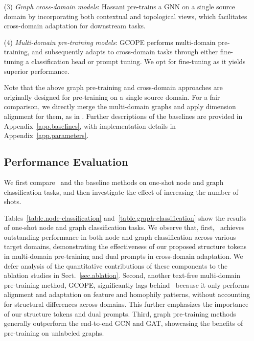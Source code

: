 (3) \textit{Graph cross-domain models}: Hassani \cite{hassani2022cross} pre-trains a GNN on a single source domain by incorporating both contextual and topological views, which facilitates cross-domain adaptation for downstream tasks.

(4) \emph{Multi-domain pre-training models}: GCOPE \cite{zhao2024all} performs multi-domain pre-training, and subsequently adapts to cross-domain tasks through either fine-tuning a classification head or prompt tuning. We opt for fine-tuning as it yields superior performance. 

Note that the above graph pre-training and cross-domain approaches are originally designed for pre-training on a single source domain. For a fair comparison, we directly merge the multi-domain graphs and apply dimension alignment for them, as in \model.
Further descriptions of the baselines are provided in Appendix~\ref{app.baselines}, with implementation details in Appendix~\ref{app.parameters}.



\subsection{Performance Evaluation}\label{sec.exp.per}
We first compare \model\ and the baseline methods on one-shot node and graph classification tasks, and then investigate the effect of increasing the number of shots.


\label{exp.main}
Tables~\ref{table.node-classification} and~\ref{table.graph-classification} show the results of one-shot node and graph classification tasks. 
We observe that, first, \model\ achieves outstanding performance in both node and graph classification across various target domains, demonstrating the effectiveness of our proposed structure tokens in multi-domain pre-training and dual prompts in cross-domain adaptation. We defer analysis of the quantitative contributions of these components to the ablation studies in Sect.~\ref{sec.ablation}.
Second, another text-free multi-domain pre-training method, GCOPE, significantly lags behind \model\ because it only performs alignment and adaptation on feature and  homophily patterns, without accounting for structural differences across domains.
This further emphasizes the importance of our structure tokens and dual prompts.
Third, graph pre-training methods generally outperform the end-to-end GCN and GAT, showcasing the benefits of pre-training on unlabeled graphs.


